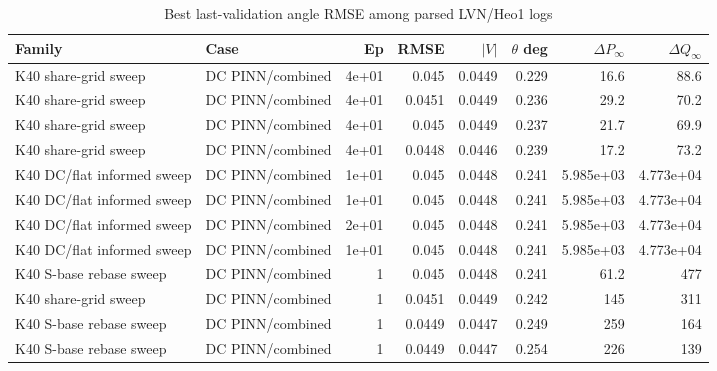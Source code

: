 \documentclass[10pt]{article}
\begin{document}
\begin{table}[t]
\centering
\caption{Best last-validation angle RMSE among parsed LVN/Heo1 logs}
\scriptsize
\begin{tabular}{llrrrrrr}
\toprule
Family & Case & Ep & RMSE & $|V|$ & $\theta$ deg & $\Delta P_\infty$ & $\Delta Q_\infty$ \\
\midrule
K40 share-grid sweep & DC PINN/combined & 4e+01 & 0.045 & 0.0449 & 0.229 & 16.6 & 88.6 \\
K40 share-grid sweep & DC PINN/combined & 4e+01 & 0.0451 & 0.0449 & 0.236 & 29.2 & 70.2 \\
K40 share-grid sweep & DC PINN/combined & 4e+01 & 0.045 & 0.0449 & 0.237 & 21.7 & 69.9 \\
K40 share-grid sweep & DC PINN/combined & 4e+01 & 0.0448 & 0.0446 & 0.239 & 17.2 & 73.2 \\
K40 DC/flat informed sweep & DC PINN/combined & 1e+01 & 0.045 & 0.0448 & 0.241 & 5.985e+03 & 4.773e+04 \\
K40 DC/flat informed sweep & DC PINN/combined & 1e+01 & 0.045 & 0.0448 & 0.241 & 5.985e+03 & 4.773e+04 \\
K40 DC/flat informed sweep & DC PINN/combined & 2e+01 & 0.045 & 0.0448 & 0.241 & 5.985e+03 & 4.773e+04 \\
K40 DC/flat informed sweep & DC PINN/combined & 1e+01 & 0.045 & 0.0448 & 0.241 & 5.985e+03 & 4.773e+04 \\
K40 S-base rebase sweep & DC PINN/combined & 1 & 0.045 & 0.0448 & 0.241 & 61.2 & 477 \\
K40 share-grid sweep & DC PINN/combined & 1 & 0.0451 & 0.0449 & 0.242 & 145 & 311 \\
K40 S-base rebase sweep & DC PINN/combined & 1 & 0.0449 & 0.0447 & 0.249 & 259 & 164 \\
K40 S-base rebase sweep & DC PINN/combined & 1 & 0.0449 & 0.0447 & 0.254 & 226 & 139 \\
\bottomrule
\end{tabular}
\end{table}
\end{document}

